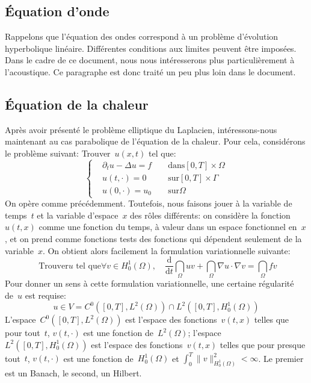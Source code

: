 \medskip
\subsection{Équation d'onde}
Rappelons que l'équation des ondes correspond à un problème d'évolution
hyperbolique linéaire.
Différentes conditions aux limites peuvent être imposées.
Dans le cadre de ce document, nous nous intéresserons plus particulièrement
à l'acoustique.
Ce paragraphe est donc traité un peu plus loin dans le document.

\medskip
\subsection{Équation de la chaleur}
Après avoir présenté le problème elliptique du Laplacien, intéressons-nous
maintenant au cas parabolique de l'équation de la chaleur.
Pour cela, considérons le problème suivant:
Trouver~$u(x,t)$ tel que:
\begin{equation}
\left\{
\begin{aligned}
&\partial_t u -\Delta u = f &&\text{ dans} [0,T]\times\Omega\\
&u(t,\cdot) = 0 &&\text{ sur} [0,T]\times\Gamma\\
&u(0,\cdot)=u_0 &&\text{ sur} \Omega
\end{aligned}
\right.
\end{equation}
\medskip
On opère comme précédemment.
Toutefois, nous faisons jouer à la variable de temps~$t$ et la variable d'espace~$x$
des rôles différents: on considère la fonction~$u(t, x)$ comme une fonction
du temps, à valeur dans un espace fonctionnel en~$x$, et on prend comme fonctions
tests des fonctions qui dépendent seulement de la variable~$x$.
On obtient alors facilement la formulation variationnelle suivante:
\begin{equation}
\text{ Trouver} u \text{ tel que} \forall v\in H^1_0(\Omega),\quad
\dfrac{\mathrm d}{\mathrm dt}\dint_\Omega uv+\dint_\Omega \nabla u\cdot\nabla v=\dint_\Omega fv
\end{equation}
Pour donner un sens à cette formulation variationnelle, une certaine régularité de~$u$ est requise:
\begin{equation}
u\in V = C^0\left([0,T],L^2(\Omega)\right)\cap L^2\left([0,T],H^1_0(\Omega)\right)
\end{equation}
L'espace~$C^0\left([0,T],L^2(\Omega)\right)$ est l'espace des fonctions~$v(t,x)$ telles
que pour tout~$t$, $v(t,\cdot)$ est une fonction de~$L^2(\Omega)$;
l'espace~$L^2\left([0,T],H^1_0(\Omega)\right)$ est l'espace des fonctions~$v(t,x)$ telles
que pour presque tout~$t$, $v(t,\cdot)$ est une fonction de~$H^1_0(\Omega)$ et
$\int_0^T \|v\|^2_{H^1_0(\Omega)}<\infty$. Le premier est un Banach, le second, un Hilbert.

